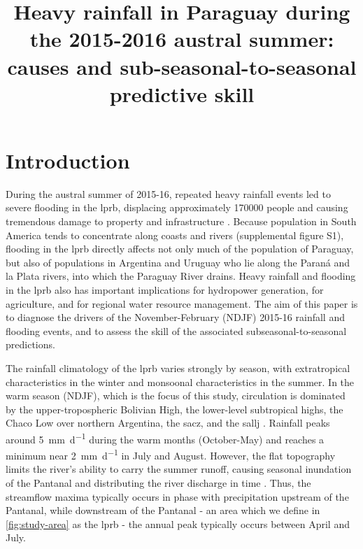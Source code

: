 \documentclass[twocol]{ametsoc}
\title{Heavy rainfall in Paraguay during the 2015-2016 austral summer: causes and sub-seasonal-to-seasonal predictive skill}
\affiliation{Columbia Water Center. Dept. of Earth and Environmental Engineering, Columbia University, 500 W. 120th St., New York, NY. USA \\ Columbia Water Center, Columbia University, 500 W. 120th St., New York, NY. USA}
\begin{document}
\maketitle

\section{Introduction}

During the austral summer of 2015-16, repeated heavy rainfall events led to severe flooding in the \gls{lprb}, displacing approximately \num{170000} people \citep{Brakenridge2016} and causing tremendous damage to property and infrastructure \citep{MinisteriodeObrasPublicasyComunicacion2016}.
Because population in South America tends to concentrate along coasts and rivers (supplemental figure S1), flooding in the \gls{lprb} directly affects not only much of the population of Paraguay, but also of populations in Argentina and Uruguay who lie along the Paran\'{a} and la Plata rivers, into which the Paraguay River drains.
Heavy rainfall and flooding in the \gls{lprb} also has important implications for hydropower generation, for agriculture, and for regional water resource management.
The aim of this paper is to diagnose the drivers of the November-February (NDJF) 2015-16 rainfall and flooding events, and to assess the skill of the associated subseasonal-to-seasonal predictions.

The rainfall climatology of the \gls{lprb} varies strongly by season, with extratropical characteristics in the winter and monsoonal characteristics in the summer.
In the warm season (NDJF), which is the focus of this study, circulation is dominated by the upper-tropospheric Bolivian High, the lower-level subtropical highs, the Chaco Low over northern Argentina, the \gls{sacz}, and the \gls{sallj} \citep{Grimm2009,Marengo2012}.
Rainfall peaks around \SI{5}{\milli\meter\per\day} during the warm months (October-May) and reaches a minimum near \SI{2}{\milli\meter\per\day} in July and August.
However, the flat topography limits the river's ability to carry the summer runoff, causing seasonal inundation of the Pantanal and distributing the river discharge in time \citep{Bravo2011,Barros2004}.
Thus, the streamflow maxima typically occurs in phase with precipitation upstream of the Pantanal, while downstream of the Pantanal - an area which we define in \cref{fig:study-area} as the \acrlong{lprb} - the annual peak typically occurs between April and July.
\end{document}
